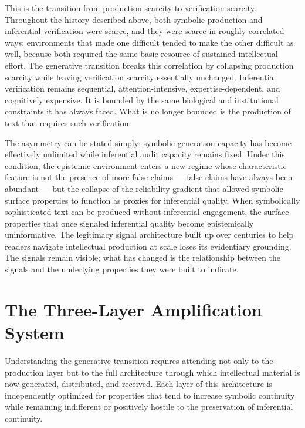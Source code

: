 \documentclass[12pt, openright, twoside]{book}
\begin{document}
This is the transition from production scarcity to verification scarcity.
Throughout the history described above, both symbolic production and
inferential verification were scarce, and they were scarce in roughly
correlated ways: environments that made one difficult tended to make the other
difficult as well, because both required the same basic resource of sustained
intellectual effort. The generative transition breaks this correlation by
collapsing production scarcity while leaving verification scarcity essentially
unchanged. Inferential verification remains sequential, attention-intensive,
expertise-dependent, and cognitively expensive. It is bounded by the same
biological and institutional constraints it has always faced. What is no
longer bounded is the production of text that requires such verification.

The asymmetry can be stated simply: symbolic generation capacity has become
effectively unlimited while inferential audit capacity remains fixed. Under
this condition, the epistemic environment enters a new regime whose
characteristic feature is not the presence of more false claims --- false
claims have always been abundant --- but the collapse of the reliability
gradient that allowed symbolic surface properties to function as proxies
for inferential quality. When symbolically sophisticated text can be produced
without inferential engagement, the surface properties that once signaled
inferential quality become epistemically uninformative. The legitimacy signal
architecture built up over centuries to help readers navigate intellectual
production at scale loses its evidentiary grounding. The signals remain
visible; what has changed is the relationship between the signals and the
underlying properties they were built to indicate.

\section{The Three-Layer Amplification System}

Understanding the generative transition requires attending not only to the
production layer but to the full architecture through which intellectual
material is now generated, distributed, and received. Each layer of this
architecture is independently optimized for properties that tend to increase
symbolic continuity while remaining indifferent or positively hostile to the
preservation of inferential continuity.
\end{document}
